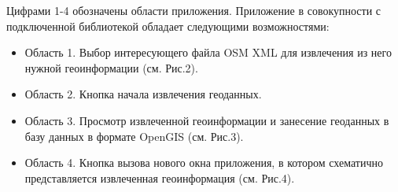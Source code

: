 \documentclass[12pt,a4paper,oneside]{article} %
\begin{document}
Цифрами 1-4 обозначены области приложения.
\newpage
Приложение в совокупности с подключенной библиотекой обладает \linebreak
следующими возможностями:
\begin{itemize}
\item Область 1. Выбор интересующего файла OSM XML для извлечения  \linebreak
из него нужной
геоинформации (см. Рис.2).

\begin{figure}[h!]
\end{figure}

\item Область 2. Кнопка начала извлечения геоданных.

\item Область 3. Просмотр извлеченной геоинформации и занесение  \linebreak
геоданных в базу
данных в формате OpenGIS (см. Рис.3).

\begin{figure}[h!]
\end{figure}

\newpage
\item Область 4. Кнопка вызова нового окна приложения, в котором  \linebreak
схематично представляется извлеченная геоинформация (см. Рис.4).


\end{itemize}
\end{document}
